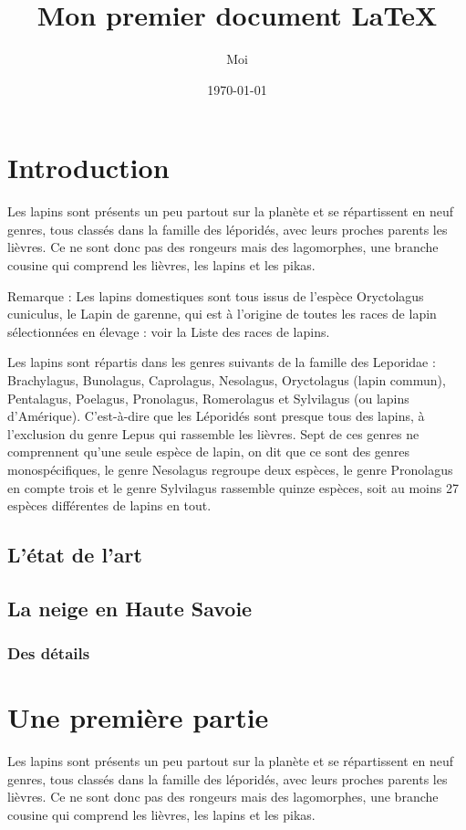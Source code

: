 \documentclass{article}
\title{Mon premier document \LaTeX}
\author{Moi}
\date{\today}
\begin{document}
\maketitle
\tableofcontents

 
\section{Introduction}
Les lapins sont présents un peu partout sur la planète et se répartissent en neuf genres, tous classés dans la famille des léporidés, avec leurs proches parents les lièvres. Ce ne sont donc pas des rongeurs mais des lagomorphes, une branche cousine qui comprend les lièvres, les lapins et les pikas.

Remarque : Les lapins domestiques sont tous issus de l'espèce Oryctolagus cuniculus, le Lapin de garenne, qui est à l'origine de toutes les races de lapin sélectionnées en élevage : voir la Liste des races de lapins.

Les lapins sont répartis dans les genres suivants de la famille des Leporidae : Brachylagus, Bunolagus, Caprolagus, Nesolagus, Oryctolagus (lapin commun), Pentalagus, Poelagus, Pronolagus, Romerolagus et Sylvilagus (ou lapins d'Amérique). C'est-à-dire que les Léporidés sont presque tous des lapins, à l'exclusion du genre Lepus qui rassemble les lièvres. Sept de ces genres ne comprennent qu'une seule espèce de lapin, on dit que ce sont des genres monospécifiques, le genre Nesolagus regroupe deux espèces, le genre Pronolagus en compte trois et le genre Sylvilagus rassemble quinze espèces, soit au moins 27 espèces différentes de lapins en tout.

\subsection{L'état de l'art}
\subsection{La neige en Haute Savoie}
\subsubsection{Des détails}

\section{Une première partie}
Les lapins sont présents un peu partout sur la planète et se répartissent en neuf genres, tous classés dans la famille des léporidés, avec leurs proches parents les lièvres. Ce ne sont donc pas des rongeurs mais des lagomorphes, une branche cousine qui comprend les lièvres, les lapins et les pikas.
\end{document}
